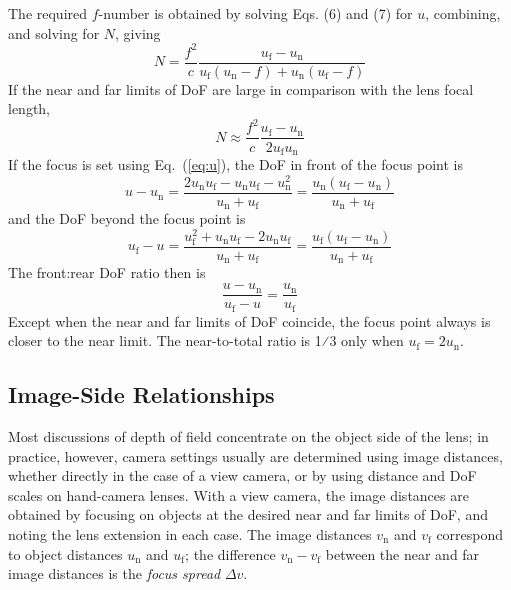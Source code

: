 \documentclass[11pt, oneside]{scrartcl}   	%
\newcommand{\Dv}{\ensuremath{\Delta v}}
\begin{document}
The required $f$-number is obtained by solving Eqs. (6) and (7) for
$u$, combining, and solving for $N$, giving
\begin{equation}
  \label{eq:N}
  N = \frac{f^2}c\frac{u_\mathrm{f} - u_\mathrm{n}}{u_\mathrm{f}(u_\mathrm{n}-f)+u_\mathrm{n}(u_\mathrm{f}-f)}
\end{equation}
If the near and far limits of DoF are large in comparison with the lens focal length,
\begin{equation}
  \label{eq:Napprox}
  N\approx \frac{f^2}c\frac{u_\mathrm{f} - u_\mathrm{n}}{2u_\mathrm{f}u_\mathrm{n}}
\end{equation}
If the focus is set using Eq.~(\ref{eq:u}), the DoF in front of the
focus point is
\begin{equation}
  \label{eq:DOFf}
  u-u_\mathrm{n}=\frac{2u_\mathrm{n}u_\mathrm{f}-u_\mathrm{n}u_\mathrm{f}-u_\mathrm{n}^2}{u_\mathrm{n} + u_\mathrm{f}} = \frac{u_\mathrm{n}(u_\mathrm{f} - u_\mathrm{n})}{u_\mathrm{n} + u_\mathrm{f}}
\end{equation}
and the DoF beyond the focus point is
\begin{equation}
  \label{eq:DOFb}
  u_\mathrm{f} - u = \frac{u_\mathrm{f}^2 +u_\mathrm{n}u_\mathrm{f}-2u_\mathrm{n}u_\mathrm{f}}{u_\mathrm{n} + u_\mathrm{f}} = \frac{u_\mathrm{f}(u_\mathrm{f} - u_\mathrm{n})}{u_\mathrm{n} + u_\mathrm{f}}
\end{equation}
The front:rear DoF ratio then is
\begin{equation}
  \label{eq:frrat}
  \frac{u - u_\mathrm{n}}{u_\mathrm{f} - u} = \frac{u_\mathrm{n}}{u_\mathrm{f}}
\end{equation}
Except when the near and far limits of DoF coincide, the focus point always is closer to the
near limit. The near-to-total ratio is 1⁄3 only when $u_\mathrm{f} = 2u_\mathrm{n}$.

\subsection{Image-Side Relationships}
Most discussions of depth of field concentrate on the object side of the lens; in practice, however, camera settings usually are determined using image distances, whether directly in the case of a view camera, or by using distance and DoF scales on hand-camera lenses. With a view camera, the image distances are obtained by focusing on objects at the desired near and far limits of DoF, and noting the lens extension in each case. The image distances $v_\mathrm{n}$ and $v_\mathrm{f}$ correspond to object distances $u_\mathrm{n}$ and $u_\mathrm{f}$; the difference $v_\mathrm{n}-v_\mathrm{f}$ between the near and far image distances is the \emph{focus spread} $\Dv$.
\end{document}
